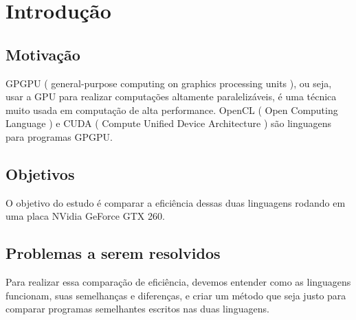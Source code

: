 \section{Introdução}
\subsection{Motivação}
GPGPU ( general-purpose computing on graphics processing units ), ou seja, usar a GPU para 
realizar computações altamente paralelizáveis, é uma técnica muito usada em computação de alta performance.
OpenCL ( Open Computing Language ) e CUDA ( Compute Unified Device Architecture ) são linguagens para
programas GPGPU.
\subsection{Objetivos}
O objetivo do estudo é comparar a eficiência dessas duas linguagens rodando em uma placa NVidia GeForce GTX 260.
\subsection{Problemas a serem resolvidos}
Para realizar essa comparação de eficiência, devemos entender como as linguagens funcionam, suas semelhanças e
diferenças, e criar um método que seja justo para comparar programas semelhantes escritos nas duas linguagens.
